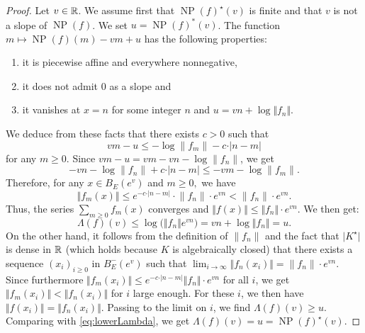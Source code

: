 \documentclass{lms}
\DeclareMathOperator{\NP}{NP}
\begin{document}
\begin{proof}
Let $v \in \mathbb R$. We assume first that $\NP(f)^\star(v)$ is finite and 
that $v$ is not a slope of $\NP(f)$. We set $u = \NP(f)^*(v)$. The 
function $m \mapsto \NP(f)(m) - vm + u$ has the following properties:
\begin{enumerate}
\item it is piecewise affine and everywhere nonnegative,
\item it does not admit $0$ as a slope and
\item it vanishes at $x = n$ for some integer $n$ and $u = vn + \log \Vert f_n \Vert$.
\end{enumerate}
We deduce from these facts that there exists $c>0$ such that 
\[
vm-u \leq - \log \lVert f_m \rVert - c \cdot \vert n-m \vert
\]
for any $m\geq 0$.
Since $vm-u=vm-vn-\log \lVert f_n \rVert$, we get 
\[
-vn-\log \lVert f_n \rVert + c \cdot \vert n-m \vert \leq -vm-\log \lVert f_m \rVert.
\]
Therefore, for any $x \in  B_E(e^v)$ and $m \geq 0,$ we have
\[
\Vert f_m (x) \Vert \leq e^{-c \cdot \vert n-m \vert } \cdot
\lVert f_n \rVert \cdot e^{vn}< \lVert f_n \rVert \cdot e^{vn}.
\]
Thus, the series $\sum_{m \geq 0} f_m(x)$ converges and $\Vert f(x) 
\Vert \leq \Vert f_n \Vert \cdot e^{vn}$. We then get:
\begin{equation}
\label{eq:lowerLambda}
\Lambda (f)(v) \leq \log \big( \Vert f_n \Vert e^{vn} \big)
= vn + \log \Vert f_n \Vert = u.
\end{equation}
On the other hand, it follows from the definition of $\lVert f_n \rVert$ 
and the fact that $\vert K^\star \vert$ is dense in $\mathbb R$ (which holds
because $K$ is algebraically closed)
that there exists a sequence $(x_i)_{i\geq 0}$ in $B^-_E(e^v)$ such that 
$\lim_{i \to \infty} \Vert f_n (x_i) \Vert= \lVert f_n \rVert \cdot e^{vn}$. Since 
furthermore $\Vert f_m (x_i) \Vert \leq e^{-c \cdot \vert n-m \vert} 
\Vert f_n \Vert \cdot e^{vn}$ for all $i$, we get $\Vert f_m (x_i) \Vert 
< \Vert f_n (x_i) \Vert$ for $i$ large enough. For these $i$, we then 
have $\Vert f(x_i) \Vert = \Vert f_n (x_i) \Vert$. Passing to the limit 
on $i$, we find $\Lambda (f)(v) \geq u$. Comparing with 
\eqref{eq:lowerLambda}, we get $\Lambda (f)(v) = u = 
\NP(f)^\star(v)$.

\smallskip


\end{proof}
\end{document}
